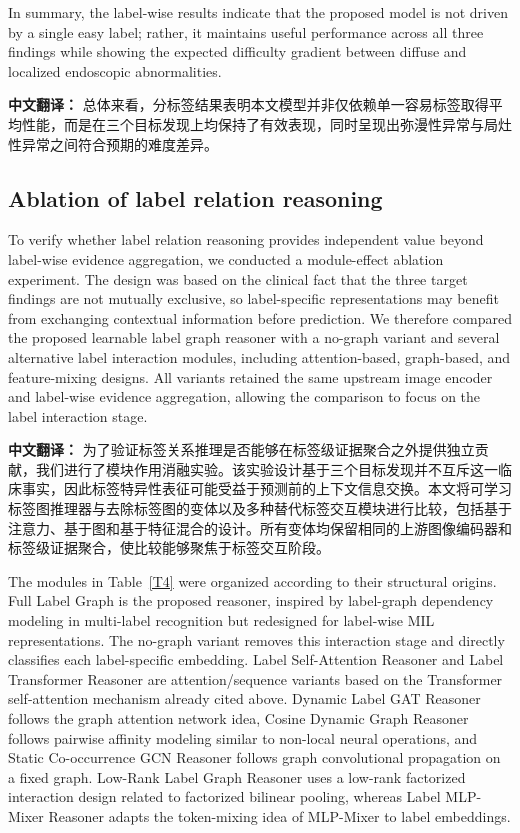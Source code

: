 \documentclass[Afour,sagev,times]{sagej}
\begin{document}
In summary, the label-wise results indicate that the proposed model is not driven by a single easy label; rather, it maintains useful performance across all three findings while showing the expected difficulty gradient between diffuse and localized endoscopic abnormalities.

\textbf{中文翻译：} 总体来看，分标签结果表明本文模型并非仅依赖单一容易标签取得平均性能，而是在三个目标发现上均保持了有效表现，同时呈现出弥漫性异常与局灶性异常之间符合预期的难度差异。

\subsection{Ablation of label relation reasoning}
To verify whether label relation reasoning provides independent value beyond label-wise evidence aggregation, we conducted a module-effect ablation experiment. The design was based on the clinical fact that the three target findings are not mutually exclusive, so label-specific representations may benefit from exchanging contextual information before prediction. We therefore compared the proposed learnable label graph reasoner with a no-graph variant and several alternative label interaction modules, including attention-based, graph-based, and feature-mixing designs. All variants retained the same upstream image encoder and label-wise evidence aggregation, allowing the comparison to focus on the label interaction stage.

\textbf{中文翻译：} 为了验证标签关系推理是否能够在标签级证据聚合之外提供独立贡献，我们进行了模块作用消融实验。该实验设计基于三个目标发现并不互斥这一临床事实，因此标签特异性表征可能受益于预测前的上下文信息交换。本文将可学习标签图推理器与去除标签图的变体以及多种替代标签交互模块进行比较，包括基于注意力、基于图和基于特征混合的设计。所有变体均保留相同的上游图像编码器和标签级证据聚合，使比较能够聚焦于标签交互阶段。

The modules in Table~\ref{T4} were organized according to their structural origins. Full Label Graph is the proposed reasoner, inspired by label-graph dependency modeling in multi-label recognition but redesigned for label-wise MIL representations. The no-graph variant removes this interaction stage and directly classifies each label-specific embedding. Label Self-Attention Reasoner and Label Transformer Reasoner are attention/sequence variants based on the Transformer self-attention mechanism already cited above. Dynamic Label GAT Reasoner follows the graph attention network idea,\cite{R23} Cosine Dynamic Graph Reasoner follows pairwise affinity modeling similar to non-local neural operations,\cite{R24} and Static Co-occurrence GCN Reasoner follows graph convolutional propagation on a fixed graph.\cite{R25} Low-Rank Label Graph Reasoner uses a low-rank factorized interaction design related to factorized bilinear pooling,\cite{R26} whereas Label MLP-Mixer Reasoner adapts the token-mixing idea of MLP-Mixer to label embeddings.\cite{R27}
\end{document}
